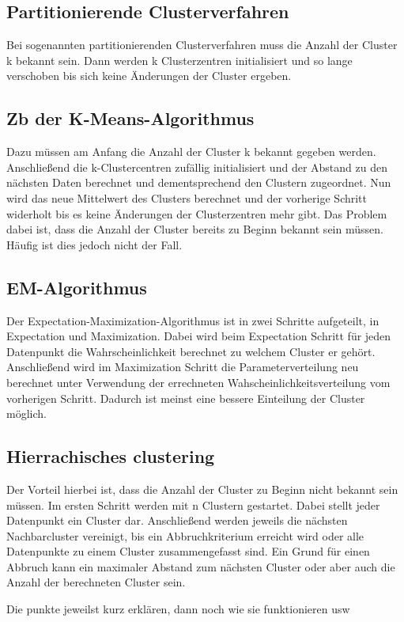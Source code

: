 \subsection{Partitionierende Clusterverfahren}
Bei sogenannten partitionierenden Clusterverfahren muss die Anzahl der Cluster k bekannt sein. Dann werden k Clusterzentren initialisiert und so lange verschoben bis sich keine Änderungen der Cluster ergeben. 

\subsection{Zb der K-Means-Algorithmus}
Dazu müssen am Anfang die Anzahl der Cluster k bekannt gegeben werden. Anschließend die k-Clustercentren zufällig initialisiert und der Abstand zu den nächsten Daten berechnet und dementsprechend den Clustern zugeordnet. Nun wird das neue Mittelwert des Clusters berechnet und der vorherige Schritt widerholt bis es keine Änderungen der Clusterzentren mehr gibt. Das Problem dabei ist, dass die Anzahl der Cluster bereits zu Beginn bekannt sein müssen. Häufig ist dies jedoch nicht der Fall.

\subsection{EM-Algorithmus}
Der Expectation-Maximization-Algorithmus ist in zwei Schritte aufgeteilt, in Expectation und Maximization. Dabei wird beim Expectation Schritt für jeden Datenpunkt die Wahrscheinlichkeit berechnet zu welchem Cluster er gehört. Anschließend wird im Maximization Schritt die Parameterverteilung neu berechnet unter Verwendung der errechneten Wahscheinlichkeitsverteilung vom vorherigen Schritt. Dadurch ist meinst eine bessere Einteilung der Cluster möglich.

\subsection{Hierrachisches clustering}
Der Vorteil hierbei ist, dass die Anzahl der Cluster zu Beginn nicht bekannt sein müssen. Im ersten Schritt werden mit n Clustern gestartet. Dabei stellt jeder Datenpunkt ein Cluster dar. Anschließend werden jeweils die nächsten Nachbarcluster vereinigt, bis ein Abbruchkriterium erreicht wird oder alle Datenpunkte zu einem Cluster zusammengefasst sind. Ein Grund für einen Abbruch kann ein maximaler Abstand zum nächsten Cluster oder aber auch die Anzahl der berechneten Cluster sein.


Die punkte jeweilst kurz erklären, dann noch wie sie funktionieren usw

